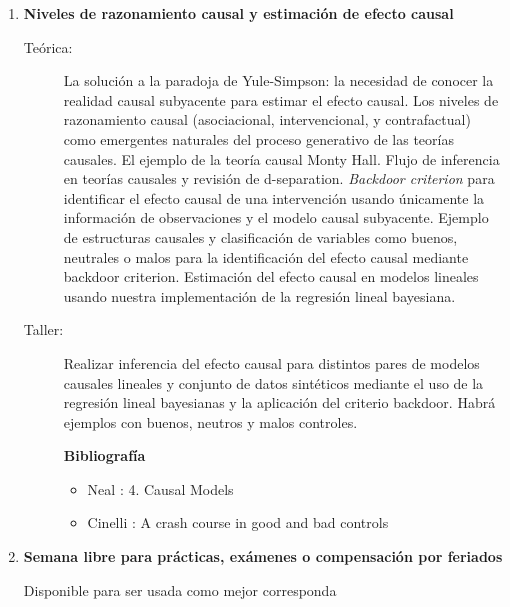 \documentclass[10pt]{article}
\begin{document}
\begin{enumerate}
\item \textbf{Niveles de razonamiento causal y estimación de efecto causal}
\vspace{-0.15cm}
\begin{description}
\item[Teórica:] La solución a la paradoja de Yule-Simpson: la necesidad de conocer la realidad causal subyacente para estimar el efecto causal.
Los niveles de razonamiento causal (asociacional, intervencional, y contrafactual) como emergentes naturales del proceso generativo de las teorías causales.
El ejemplo de la teoría causal Monty Hall.
Flujo de inferencia en teorías causales y revisión de d-separation.
\emph{Backdoor criterion} para identificar el efecto causal de una intervención usando únicamente la información de observaciones y el modelo causal subyacente.
Ejemplo de estructuras causales y clasificación de variables como buenos, neutrales o malos para la identificación del efecto causal mediante backdoor criterion.
Estimación del efecto causal en modelos lineales usando nuestra implementación de la regresión lineal bayesiana.
\item[Taller:] Realizar inferencia del efecto causal para distintos pares de modelos causales lineales y conjunto de datos sintéticos mediante el uso de la regresión lineal bayesianas y la aplicación del criterio backdoor.
Habrá ejemplos con buenos, neutros y malos controles.
\item[] \textbf{Bibliografía}
\begin{itemize}
\item Neal \cite{neal2020}: 4. Causal Models
\item Cinelli \cite{cinelli2022-controls}: A crash course in good and bad controls
\end{itemize}
\end{description}



\item \textbf{Semana libre para prácticas, exámenes o compensación por feriados}
\vspace{-0.15cm}
\begin{description}
\item[Disponible para ser usada como mejor corresponda]
\end{description}


\end{enumerate}
\end{document}
